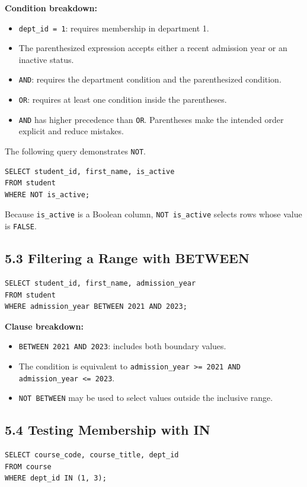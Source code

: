 \documentclass[12pt,a4paper]{article}
\begin{document}
\noindent\textbf{Condition breakdown:}
\begin{itemize}
    \item \texttt{dept\_id = 1}: requires membership in department 1.
    \item The parenthesized expression accepts either a recent admission year or an inactive
    status.
    \item \texttt{AND}: requires the department condition and the parenthesized condition.
    \item \texttt{OR}: requires at least one condition inside the parentheses.
    \item \texttt{AND} has higher precedence than \texttt{OR}. Parentheses make the intended order
    explicit and reduce mistakes.
\end{itemize}

The following query demonstrates \texttt{NOT}.

\begin{verbatim}
SELECT student_id, first_name, is_active
FROM student
WHERE NOT is_active;
\end{verbatim}

\noindent Because \texttt{is\_active} is a Boolean column, \texttt{NOT is\_active} selects rows
whose value is \texttt{FALSE}.

\subsection*{5.3 Filtering a Range with BETWEEN}
\begin{verbatim}
SELECT student_id, first_name, admission_year
FROM student
WHERE admission_year BETWEEN 2021 AND 2023;
\end{verbatim}

\noindent\textbf{Clause breakdown:}
\begin{itemize}
    \item \texttt{BETWEEN 2021 AND 2023}: includes both boundary values.
    \item The condition is equivalent to
    \texttt{admission\_year >= 2021 AND admission\_year <= 2023}.
    \item \texttt{NOT BETWEEN} may be used to select values outside the inclusive range.
\end{itemize}

\subsection*{5.4 Testing Membership with IN}
\begin{verbatim}
SELECT course_code, course_title, dept_id
FROM course
WHERE dept_id IN (1, 3);
\end{verbatim}
\end{document}
